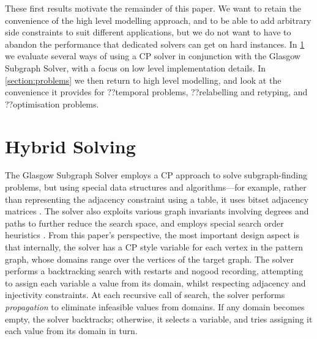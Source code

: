 \documentclass[runningheads]{llncs}
\begin{document}
These first results motivate the remainder of this paper. We want to retain the convenience of the
high level modelling approach, and to be able to add arbitrary side constraints to suit different
applications, but we do not want to have to abandon the performance that dedicated solvers can get
on hard instances. In \cref{section:hybrid} we evaluate several ways of using a CP solver in
conjunction with the Glasgow Subgraph Solver, with a focus on low level implementation details. In
\cref{section:problems} we then return to high level modelling, and look at the convenience it
provides for ??temporal problems, ??relabelling and retyping, and ??optimisation problems.

\section{Hybrid Solving}\label{section:hybrid}

The Glasgow Subgraph Solver \cite{DBLP:conf/gg/McCreeshP020} employs a CP approach to solve
subgraph-finding problems, but using special data structures and algorithms---for example, rather
than representing the adjacency constraint using a table, it uses bitset adjacency matrices
\cite{DBLP:conf/cp/McCreeshP15}. The solver also exploits various graph invariants involving degrees
\cite{DBLP:journals/constraints/ZampelliDS10} and paths \cite{DBLP:conf/cp/AudemardLMGP14} to
further reduce the search space, and employs special search order heuristics
\cite{DBLP:conf/cpaior/ArchibaldDHMP019}. From this paper's perspective, the most important design
aspect is that internally, the solver has a CP style variable for each vertex in the pattern graph,
whose domains range over the vertices of the target graph. The solver performs a backtracking search
with restarts and nogood recording, attempting to assign each variable a value from its domain,
whilst respecting adjacency and injectivity constraints. At each recursive call of search, the
solver performs \emph{propagation} to eliminate infeasible values from domains. If any domain
becomes empty, the solver backtracks; otherwise, it selects a variable, and tries assigning it each
value from its domain in turn.
\end{document}
